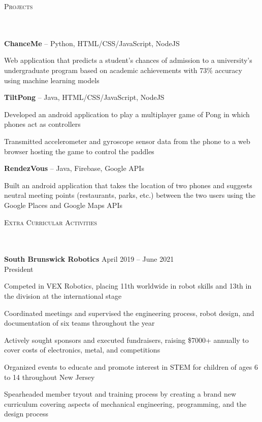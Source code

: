 \documentclass{article}
\newcommand{\header}[1]{{
\hspace*{0pt}\vspace*{6pt} \textsc{#1}} \vspace*{-6pt} 
\lineunder
}
\newcommand{\lineunder}{
\vspace*{-8pt} \\ \hspace*{-3pt} 
\hrulefill \\
}
\newcommand{\employer}[4]{{
\vspace*{2pt}%
\textbf{#1} #2 \hfill #3\\ #4 \vspace*{2pt}}
}
\newcommand{\project}[3]{{
\vspace*{2pt}%
\textbf{#1} #2 \hfill #3\vspace*{2pt}}
}
\renewcommand{\labelitemii}{
$\vcenter{\hbox{\tiny$\bullet$}}$\hspace*{-3pt}
}
\newenvironment{bullet-list-minor}{
\begin{list}{\labelitemii}{\setlength\leftmargin{15pt} 
\topsep 0pt \itemsep -2pt}}{\vspace*{4pt}\end{list}
}
\begin{document}
\vspace*{4pt}%
\header{Projects}
    \project{ChanceMe}{-- Python, HTML/CSS/JavaScript, NodeJS }{}
    \begin{bullet-list-minor}
    \item Web application that predicts a student's chances of admission to a university's undergraduate program based on academic achievements with 73\% accuracy using machine learning models
    \end{bullet-list-minor}

    \project{TiltPong}{-- Java, HTML/CSS/JavaScript, NodeJS}{}
	\begin{bullet-list-minor}
	\item Developed an android application to play a multiplayer game of Pong in which phones act as controllers
	\item Transmitted accelerometer and gyroscope sensor data from the phone to a web browser hosting the game to control the paddles
    \end{bullet-list-minor}

    \project{RendezVous}{-- Java, Firebase, Google APIs}{ }
	\begin{bullet-list-minor}
    \item Built an android application that takes the location of two phones and suggests neutral meeting points (restaurants, parks, etc.) between the two users using the Google Places and Google Maps APIs
    \end{bullet-list-minor}

\vspace*{4pt}%
\header{Extra Curricular Activities}
    \employer{South Brunswick Robotics}
    {}{April 2019 -- June 2021}{President}
	\begin{bullet-list-minor}
    \item Competed in VEX Robotics, placing 11th worldwide in robot skills and 13th in the division at the international stage
    \item Coordinated meetings and supervised the engineering process, robot design, and documentation of six teams throughout the year
    \item Actively sought sponsors and executed fundraisers, raising \$7000+ annually to cover costs of electronics, metal, and competitions
    \item Organized events to educate and promote interest in STEM for children of ages 6 to 14 throughout New Jersey
    \item Spearheaded member tryout and training process by creating a brand new curriculum covering aspects of mechanical engineering, programming, and the design process
    \end{bullet-list-minor}
\end{document}
